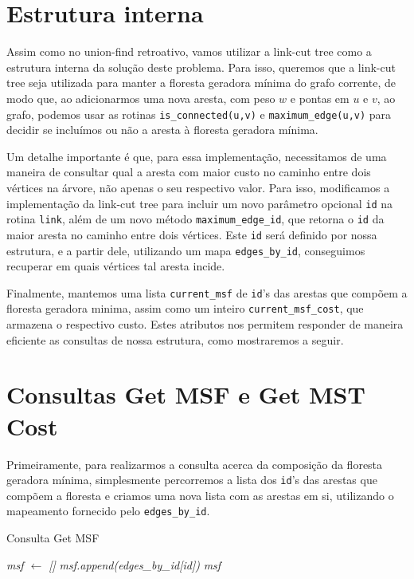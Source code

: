 \section{Estrutura interna}
\label{sec:imsf-est-int}

Assim como no union-find retroativo, vamos utilizar a link-cut tree como a estrutura interna da solução deste problema. Para isso, queremos que a link-cut tree seja utilizada para manter a floresta geradora mínima do grafo corrente, de modo que, ao adicionarmos uma nova aresta, com peso $w$ e pontas em $u$ e $v$, ao grafo, podemos usar as rotinas \texttt{is\_connected(u,v)} e \texttt{maximum\_edge(u,v)} para decidir se incluímos ou não a aresta à floresta geradora mínima.

Um detalhe importante é que, para essa implementação, necessitamos de uma maneira de consultar qual a aresta com maior custo no caminho entre dois vértices na árvore, não apenas o seu respectivo valor. Para isso, modificamos a implementação da link-cut tree para incluir um novo parâmetro opcional \texttt{id} na rotina \texttt{link}, além de um novo  método \texttt{maximum\_edge\_id}, que retorna o \texttt{id} da maior aresta no caminho entre dois vértices. Este \texttt{id} será definido por nossa estrutura, e a partir dele, utilizando um mapa \texttt{edges\_by\_id}, conseguimos recuperar em quais vértices tal aresta incide.

Finalmente, mantemos uma lista \texttt{current\_msf} de \texttt{id}'s das arestas que compõem a floresta geradora minima, assim como um inteiro \texttt{current\_msf\_cost}, que armazena o respectivo custo. Estes atributos nos permitem responder de maneira eficiente as consultas de nossa estrutura, como mostraremos a seguir.

\section{Consultas Get MSF e Get MST Cost}
\label{sec:imsf-get-msf}

Primeiramente, para realizarmos a consulta acerca da composição da floresta geradora mínima, simplesmente percorremos a lista dos \texttt{id}'s das arestas que compõem a floresta e criamos uma nova lista com as arestas em si, utilizando o mapeamento fornecido pelo \texttt{edges\_by\_id}.

\begin{algorithm}[h!]
    \caption{Consulta Get MSF}\label{imsf-get-msf}
    \begin{algorithmic}
        \State \emph{msf $\gets$ []}
        \State \emph{msf.append(edges\_by\_id[id])}
        \EndFor
        \State \Return \emph{msf}
        \EndFunction
    \end{algorithmic}
\end{algorithm}

